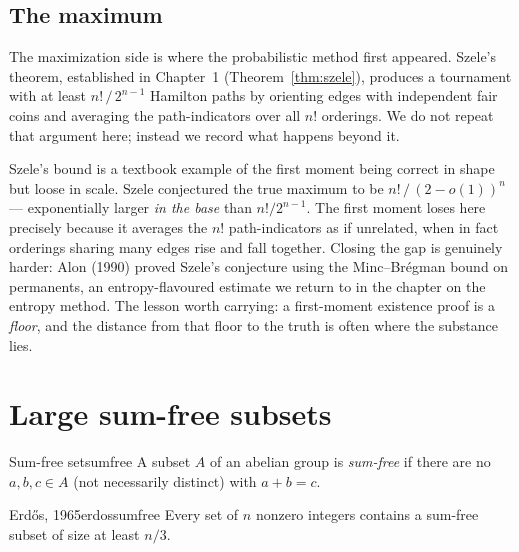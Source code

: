 \subsection*{The maximum}

The maximization side is where the probabilistic method first appeared.
Szele's theorem, established in Chapter~1 (Theorem~\ref{thm:szele}), produces
a tournament with at least $n!\,/\,2^{n-1}$ Hamilton paths by orienting edges
with independent fair coins and averaging the path-indicators over all $n!$
orderings. We do not repeat that argument here; instead we record what
happens beyond it.

\begin{insight}
Szele's bound is a textbook example of the first moment being correct in
shape but loose in scale. Szele conjectured the true maximum to be
$n!\,/\,(2-o(1))^{n}$ --- exponentially larger \emph{in the base} than
$n!/2^{n-1}$. The first moment loses here precisely because it averages the
$n!$ path-indicators as if unrelated, when in fact orderings sharing many
edges rise and fall together. Closing the gap is genuinely harder: Alon
(1990) proved Szele's conjecture using the Minc--Br\'egman bound on
permanents, an entropy-flavoured estimate we return to in the chapter on the
entropy method. The lesson worth carrying: a first-moment existence proof is
a \emph{floor}, and the distance from that floor to the truth is often where
the substance lies.
\end{insight}

\section{Large sum-free subsets}

\begin{definition}{Sum-free set}{sumfree}
A subset $A$ of an abelian group is \emph{sum-free} if there are no
$a,b,c\in A$ (not necessarily distinct) with $a+b=c$.
\end{definition}

\begin{theorem}{Erd\H{o}s, 1965}{erdossumfree}
Every set of $n$ nonzero integers contains a sum-free subset of size at least
$n/3$.
\end{theorem}

